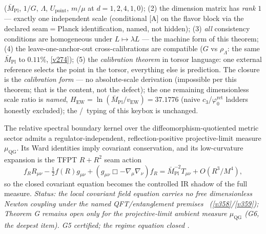 \documentclass[11pt,a4paper]{article}
\newcommand{\phiz}{\varphi_0^{\mathrm{ret}}}
\newcommand{\cthree}{c_3}
\newcommand{\Mpl}{\bar M_{\mathrm{Pl}}}
\begin{document}
\begin{keybox}
($\Mpl$, $1/G$, $\Lambda$, $U_{\mathrm{point}}$, $m/\mu$ at
$d=1,2,4,1,0$); (2) the dimension matrix has \emph{rank $1$} ---
exactly one independent scale (conditional [A] on the flavor block
via the declared seam$=$Planck identification, named, not hidden);
(3) \emph{all} consistency conditions are homogeneous under
$L\mapsto\lambda L$ --- the machine form of this theorem; (4) the
leave-one-anchor-out cross-calibrations are compatible ($G$ vs
$\rho_\Lambda$: the same $\Mpl$ to $0.11\%$, \vref{v274}); (5) the
\emph{calibration theorem} in torsor language: one external
reference selects the point in the torsor, everything else is
prediction.  The closure is the \emph{calibration form} --- no
absolute-scale derivation (impossible per this theorem; that is the
content, not the defect); the one remaining dimensionless scale
ratio is \emph{named}, $H_{\mathrm{EW}}=\ln(\Mpl/v_{\mathrm{EW}})
=37.1776$ (naive $\cthree$/$\phiz$ ladders honestly excluded); the
\mE/\mO\ typing of this keybox is unchanged.
\end{keybox}

\begin{keybox}
The relative spectral boundary kernel over the diffeomorphism-quotiented metric sector admits a
regulator-independent, reflection-positive projective-limit measure $\mu_{\mathrm{QG}}$. Its Ward
identities imply covariant conservation, and its low-curvature expansion is the TFPT $R+R^2$ seam action
\[
  f_R R_{\mu\nu}-\tfrac12 f(R)g_{\mu\nu}+(g_{\mu\nu}\Box-\nabla_\mu\nabla_\nu)f_R
  =\Mpl^{-2}T_{\mu\nu}+O(R^3/M^4),
\]
so the closed covariant equation becomes the controlled IR shadow of the full measure. \emph{Status: the
local covariant field equation carries no free dimensionless Newton coupling under the named QFT/entanglement premises \mC\ (\vref{v358}/\vref{v359}); Theorem G remains open only for
the projective-limit ambient \emph{measure} $\mu_{\mathrm{QG}}$ (G6, the deepest item). G5 certified; the
regime equation closed .}
\end{keybox}

\end{document}
